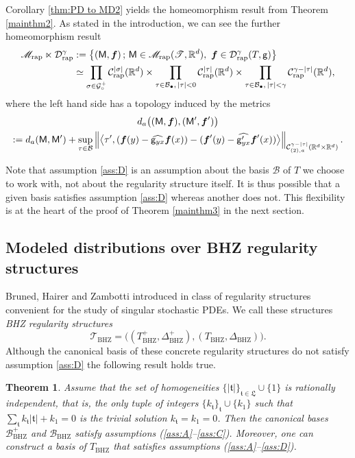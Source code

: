\documentclass[JEP,XML,SOM,Unicode,published]{cedram}
\newcommand{\sbullet}{{\scriptscriptstyle\bullet}}
\theoremstyle{plain}
\newtheorem{thm}{Theorem}
\theoremstyle{definition}
\newcommand{\bsf}{\boldsymbol{f}}
\newcommand{\rap}{\mathrm{rap}}
\newcommand{\BHZ}{{\scriptscriptstyle\mathrm{BHZ}}}
\newcommand{\scrM}{\mathscr{M}}
\newcommand{\scrT}{\mathscr{T}}
\newcommand{\frkt}{\mathfrak{t}}
\newcommand{\bbR}{\mathbb{R}}
\newcommand{\mcB}{\mathcal{B}}
\newcommand{\mcC}{\mathcal{C}}
\newcommand{\mcD}{\mathcal{D}}
\newcommand{\mcG}{\mathcal{G}}
\begin{document}
Corollary \ref{thm:PD to MD2} yields the homeomorphism result from Theorem \ref{mainthm2}. As stated in the introduction, we can see the further homeomorphism result
\begin{align*}
\scrM_{\rap}\ltimes\mcD_{\rap}^\gamma
&:=\left\{
({\sf M},\bsf)\,;\, {\sf M}\in\scrM_{\rap}(\scrT,\bbR^d),\ \bsf\in\mcD_{\rap}^\gamma(T,{\sf g}) \right\}\\
&\simeq
\prod_{\sigma\in\mcG_\circ^+} \mcC_\rap^{|\sigma|}(\bbR^d) \times \prod_{\tau\in\mcB_\sbullet,\,|\tau|<0} \mcC_\rap^{|\tau|}(\bbR^d)
\times \prod_{\tau\in\mcB_\sbullet,\, |\tau|<\gamma} \mcC_\rap^{\gamma-|\tau|}(\bbR^d),
\end{align*}
where the left hand side has a topology induced by the metrics
\begin{multline*}
d_a\bigl(({\sf M},\bsf),({\sf M}',\bsf') \bigr)\\
:=d_a({\sf M},{\sf M}')
+\sup_{\tau\in\mcB}\left\| \big\langle \tau',
(\bsf(y)-\widehat{{\sf g}_{yx}}\bsf(x))-(\bsf'(y)-\widehat{{\sf g}'_{yx}}\bsf'(x))
\big\rangle \right\|_{\mcC_{(2),a}^{\gamma-|\tau|}(\bbR^d\times\bbR^d)}.
\end{multline*}

Note that assumption \eqref{ass:D} is an assumption about the basis $\mcB$ of $T$ we choose to work with, not about the regularity structure itself. It is thus possible that a given basis satisfies assumption \eqref{ass:D} whereas another does not. This flexibility is at the heart of the proof of Theorem \ref{mainthm3} in the next section.

\subsection{Modeled distributions over BHZ regularity structures}
\label{SubsectionBHZ-RS}

Bruned, Hairer and Zambotti introduced in \cite{BHZ} class of regularity structures convenient for the study of singular stochastic PDEs. We call these structures \emph{BHZ regularity structures}
\[
\scrT_\BHZ = \bigl((T_{\BHZ}^+,\Delta^+_{\BHZ}), (T_{\BHZ},\Delta_{\BHZ})\bigr).
\]
Although the canonical basis of these concrete regularity structures do not satisfy assumption \eqref{ass:D} the following result holds true.

\begin{thm} \label{prop:reduction of antiderivative}
Assume that the set of homogeneities $\{|\mathfrak{t}|\}_{\mathfrak{t}\in\mathfrak{L}}\cup\{1\}$ is rationally independent, that is, the only tuple of integers $\{k_{\mathfrak{t}}\}_{\frkt}\cup\{k_1\}$ such that $\sum_{\mathfrak{t}}k_{\mathfrak{t}}|\mathfrak{t}|+k_1=0$ is the trivial solution $k_{\mathfrak{t}}=k_1=0$. Then the canonical bases $\mcB_{\BHZ}^+$ and $\mcB_{\BHZ}$ satisfy assumptions \textup{(\ref{ass:A}--\ref{ass:C})}.
Moreover, one can construct a basis of $T_{\BHZ}$ that satisfies assumptions \textup{(\ref{ass:A}--\ref{ass:D})}.
\end{thm}
\end{document}
